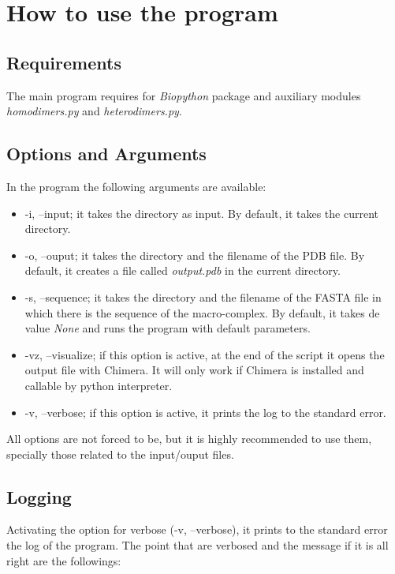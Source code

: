 \documentclass[a4paper,12pt]{report}
\begin{document}
\chapter{How to use the program}

\section{Requirements}

The main program requires for \textit{Biopython} package and auxiliary modules \textit{homodimers.py} and \textit{heterodimers.py}.

\section{Options and Arguments}

In the program the following arguments are available:

\begin{itemize}
 \item -i, --input; it takes the directory as input. By default, it takes the current directory.
 \item -o, --ouput; it takes the directory and the filename of the PDB file. By default, it creates a file called \textit{output.pdb} in the current directory.
 \item -s, --sequence; it takes the directory and the filename of the FASTA file in which there is the sequence of the macro-complex. By default, it takes de value \textit{None} and runs the program with default parameters.
 \item -vz, --visualize; if this option is active, at the end of the script it opens the output file with Chimera. It will only work if Chimera is installed and callable by python interpreter.
 \item -v, --verbose; if this option is active, it prints the log to the standard error. 
\end{itemize}

All options are not forced to be, but it is highly recommended to use them, specially those related to the input/ouput files.

\section{Logging}

Activating the option for verbose (-v, --verbose), it prints to the standard error the log of the program. The point that are verbosed and the message if it is all right are the followings:
\end{document}
